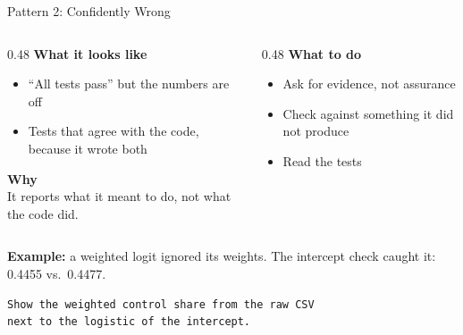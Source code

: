 \documentclass[aspectratio=169, 11pt]{beamer}
\begin{document}
\begin{frame}[fragile]{Pattern 2: Confidently Wrong}
  \begin{columns}[T]
    \begin{column}{0.48\textwidth}
      \textbf{What it looks like}
      \begin{itemize}
        \small
        \item ``All tests pass'' but the numbers are off
        \item Tests that agree with the code, because it wrote both
      \end{itemize}
      \vspace{0.4em}
      \textbf{Why}\\[0.2em]
      {\small It reports what it meant to do, not what the code did.}
    \end{column}
    \begin{column}{0.48\textwidth}
      \textbf{What to do}
      \begin{itemize}
        \small
        \item Ask for evidence, not assurance
        \item Check against something it did not produce
        \item Read the tests
      \end{itemize}
    \end{column}
  \end{columns}

  \vspace{0.6em}
  \textbf{Example:} a weighted logit ignored its weights. The intercept check caught it: 0.4455 vs.\ 0.4477.

  \vspace{0.3em}
  \begin{lstlisting}[basicstyle=\ttfamily\footnotesize]
Show the weighted control share from the raw CSV
next to the logistic of the intercept.
  \end{lstlisting}
\end{frame}
\end{document}
